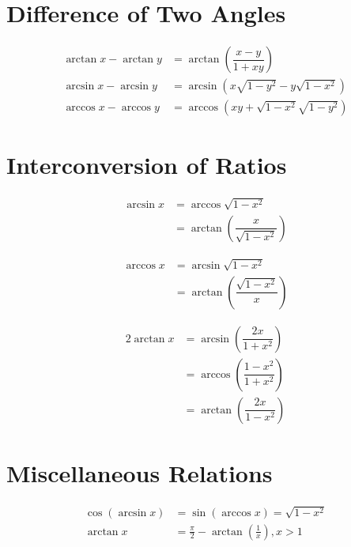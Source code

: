 \documentclass[../main.tex]{subfile}
\begin{document}
    \section{Difference of Two Angles}
    \begin{align}
        \arctan x - \arctan y & = \arctan \left( \dfrac{x - y}{1 + xy} \right)\\
        \arcsin x - \arcsin y & = \arcsin \left( x \sqrt{1 - y^2} - y \sqrt{1 - x^2} \right)\\
        \arccos x - \arccos y & = \arccos \left( xy + \sqrt{1 - x^2} \sqrt{1 - y^2} \right)
    \end{align}

    \section{Interconversion of Ratios}
    \begin{align}
        \arcsin x & = \arccos \sqrt{1-x^2}\\
                  & = \arctan \left(\dfrac{x}{\sqrt{1-x^2}}\right)
    \end{align}

    \begin{align}
        \arccos x & = \arcsin \sqrt{1-x^2}\\
                  & = \arctan \left(\dfrac{\sqrt{1-x^2}}{x}\right)
    \end{align}

    \begin{align}
        2\arctan x & = \arcsin\left(\dfrac{2x}{1+x^2}\right)\\
                   & = \arccos \left(\dfrac{1-x^2}{1+x^2}\right)\\
                   & = \arctan \left(\dfrac{2x}{1-x^2}\right)
    \end{align}
    
    \section{Miscellaneous Relations}
    \begin{align}
        \cos(\arcsin x) & = \sin(\arccos x) = \sqrt{1 - x^2}\\
        \arctan x & = \frac{\pi}{2} - \arctan \left( \frac{1}{x} \right), x>1
    \end{align}
    
\end{document}
